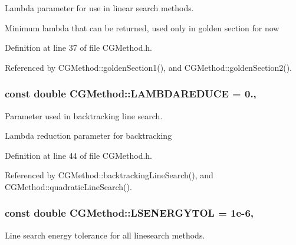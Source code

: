 Lambda parameter for use in linear search methods. 

Minimum lambda that can be returned, used only in golden section for now 

Definition at line 37 of file C\+G\+Method.\+h.



Referenced by C\+G\+Method\+::golden\+Section1(), and C\+G\+Method\+::golden\+Section2().

\hypertarget{classCGMethod_a0fa651bde0efa2e195ec6a367a0e346e}{
\subsubsection[{L\+A\+M\+B\+D\+A\+R\+E\+D\+U\+C\+E}]{\setlength{\rightskip}{0pt plus 5cm}const double C\+G\+Method\+::\+L\+A\+M\+B\+D\+A\+R\+E\+D\+U\+C\+E = 0.\hspace{0.3cm}{\ttfamily [protected]}, {\ttfamily [inherited]}}}\label{classCGMethod_a0fa651bde0efa2e195ec6a367a0e346e}


Parameter used in backtracking line search. 

Lambda reduction parameter for backtracking 

Definition at line 44 of file C\+G\+Method.\+h.



Referenced by C\+G\+Method\+::backtracking\+Line\+Search(), and C\+G\+Method\+::quadratic\+Line\+Search().

\hypertarget{classCGMethod_a084794992bdcec9285f6512b56e6c578}{
\subsubsection[{L\+S\+E\+N\+E\+R\+G\+Y\+T\+O\+L}]{\setlength{\rightskip}{0pt plus 5cm}const double C\+G\+Method\+::\+L\+S\+E\+N\+E\+R\+G\+Y\+T\+O\+L = 1e-\/6\hspace{0.3cm}{\ttfamily [protected]}, {\ttfamily [inherited]}}}\label{classCGMethod_a084794992bdcec9285f6512b56e6c578}


Line search energy tolerance for all linesearch methods. 



